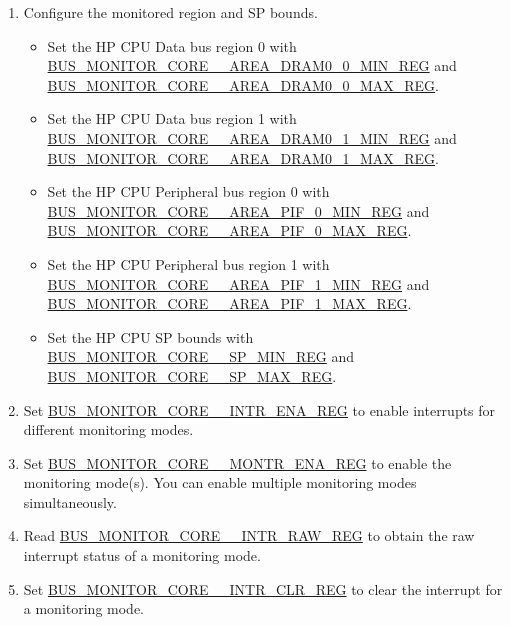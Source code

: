 \documentclass[main\_\_EN.tex]{subfiles}
\begin{document}
\begin{enumerate}
    \item Configure the monitored region and SP bounds.
        \begin{itemize}
            \item Set the HP CPU Data bus region 0 with \hyperref[regdesc:BUSMONITORCORE0AREADRAM00MINREG]{BUS\_MONITOR\_CORE\_\_AREA\_DRAM0\_0\_MIN\_REG} and \hyperref[regdesc:BUSMONITORCORE0AREADRAM00MAXREG]{BUS\_MONITOR\_CORE\_\_AREA\_DRAM0\_0\_MAX\_REG}. 
            \item Set the HP CPU Data bus region 1 with \hyperref[regdesc:BUSMONITORCORE0AREADRAM01MINREG]{BUS\_MONITOR\_CORE\_\_AREA\_DRAM0\_1\_MIN\_REG} and \hyperref[regdesc:BUSMONITORCORE0AREADRAM01MAXREG]{BUS\_MONITOR\_CORE\_\_AREA\_DRAM0\_1\_MAX\_REG}.
            \item Set the HP CPU Peripheral bus region 0 with \hyperref[regdesc:BUSMONITORCORE0AREAPIF0MINREG]{BUS\_MONITOR\_CORE\_\_AREA\_PIF\_0\_MIN\_REG} and \hyperref[regdesc:BUSMONITORCORE0AREAPIF0MAXREG]{BUS\_MONITOR\_CORE\_\_AREA\_PIF\_0\_MAX\_REG}.
            \item Set the HP CPU Peripheral bus region 1 with \hyperref[regdesc:BUSMONITORCORE0AREAPIF1MINREG]{BUS\_MONITOR\_CORE\_\_AREA\_PIF\_1\_MIN\_REG} and \hyperref[regdesc:BUSMONITORCORE0AREAPIF1MAXREG]{BUS\_MONITOR\_CORE\_\_AREA\_PIF\_1\_MAX\_REG}.
            \item Set the HP CPU SP bounds with \hyperref[regdesc:BUSMONITORCORE0SPMINREG]{BUS\_MONITOR\_CORE\_\_SP\_MIN\_REG} and \hyperref[regdesc:BUSMONITORCORE0SPMAXREG]{BUS\_MONITOR\_CORE\_\_SP\_MAX\_REG}.
        \end{itemize}
    \item Set \hyperref[regdesc:BUSMONITORCORE0INTRENAREG]{BUS\_MONITOR\_CORE\_\_INTR\_ENA\_REG} to enable interrupts for different monitoring modes.
    \item Set \hyperref[regdesc:BUSMONITORCORE0MONTRENAREG]{BUS\_MONITOR\_CORE\_\_MONTR\_ENA\_REG} to enable the monitoring mode(s). You can enable multiple monitoring modes simultaneously.
    \item Read \hyperref[regdesc:BUSMONITORCORE0INTRRAWREG]{BUS\_MONITOR\_CORE\_\_INTR\_RAW\_REG} to obtain the raw interrupt status of a monitoring mode. 
    \item Set \hyperref[regdesc:BUSMONITORCORE0INTRCLRREG]{BUS\_MONITOR\_CORE\_\_INTR\_CLR\_REG} to clear the interrupt for a monitoring mode.
\end{enumerate}
\end{document}
